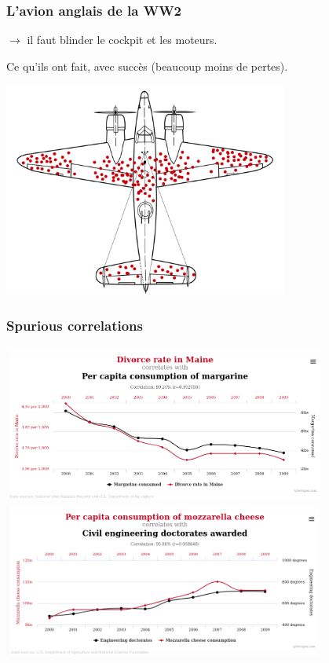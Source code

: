 \documentclass{beamer}
\begin{document}
\begin{frame}
\frametitle{L'avion anglais de la WW2}


$\rightarrow$ il faut blinder le cockpit et les moteurs.

Ce qu'ils ont fait, avec succès (beaucoup moins de pertes).


\centering
\includegraphics[width=0.7\textwidth,keepaspectratio]{img/plane.png}


\end{frame}

\begin{frame}
\frametitle{Spurious correlations}



\centering
\includegraphics[width=0.8\textwidth,keepaspectratio]{img/spurious_corr.png}
\vfill
\includegraphics[width=0.8\textwidth,keepaspectratio]{img/spurious_corr2.png}

\end{frame}
\end{document}
